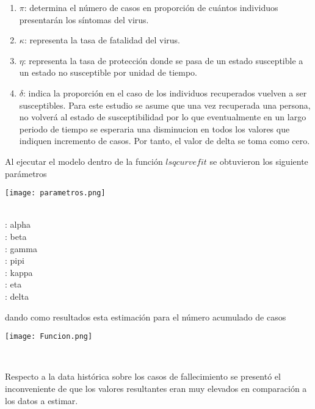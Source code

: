 \documentclass[11pt]{article}
\begin{document}
\begin{enumerate}
	\item[\textperiodcentered] \textbf {$\pi$}: determina el número de casos en proporción de cuántos individuos presentarán los síntomas del virus.
	
	\item[\textperiodcentered] \textbf {$\kappa$}: representa la tasa de fatalidad del virus. 
	
	\item[\textperiodcentered] \textbf {$\eta$}: representa la tasa de protección donde se pasa de un estado susceptible a un estado no susceptible por unidad de tiempo.
	
	\item[\textperiodcentered] \textbf {$\delta$}: indica la proporción en el caso de los individuos recuperados vuelven a ser susceptibles. Para este estudio se asume que una vez recuperada una persona, no volverá al estado de susceptibilidad por lo que eventualmente en un largo periodo de tiempo se esperaria una disminucion en todos los valores que indiquen incremento de casos. Por tanto, el valor de delta se toma como cero.
\end{enumerate}

Al ejecutar el modelo dentro de la función $lsqcurvefit$ se obtuvieron los siguiente parámetros

\begin{center}
    \texttt{[image: parametros.png]}
    \caption{
    \\\alpha: alpha 
    \\\beta: beta
    \\\gamma: gamma
    \\\pi: pipi
    \\\kappa: kappa
    \\\eta: eta
    \\\delta: delta}
    
\end{center} 

dando como resultados esta estimación para el número acumulado de casos

\begin{center}
    \texttt{[image: Funcion.png]}
    \caption{\\}
\end{center}  

Respecto a la data histórica sobre los casos de fallecimiento se presentó el inconveniente de que los valores resultantes eran muy elevados en comparación a los datos a estimar.
\end{document}
